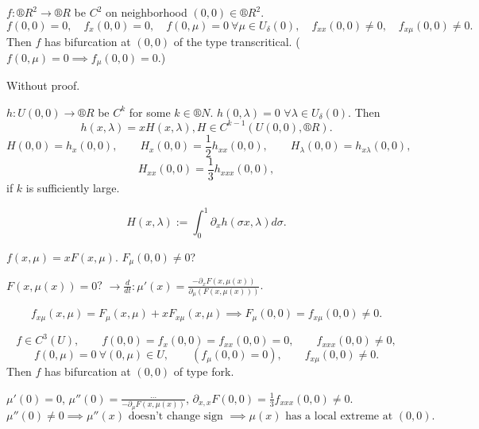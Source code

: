 \documentclass[12pt]{article}					%
\begin{document}
\begin{veta}
	$f: ®R^2 \rightarrow ®R$ be $C^2$ on neighborhood $(0, 0) \in ®R^2$.
	$$ f(0, 0) = 0, \quad f_x(0, 0) = 0, \quad f(0, \mu) = 0\ \forall \mu \in U_\delta(0), \quad f_{xx}(0, 0) ≠ 0, \quad f_{x\mu}(0, 0) ≠ 0. $$
	Then $f$ has bifurcation at $(0, 0)$ of the type transcritical. ($f(0, \mu) = 0 \implies f_\mu(0, 0) = 0$.)

	\begin{dukazin}
		Without proof.
	\end{dukazin}
\end{veta}

\begin{lemma}
	$h: U(0, 0) \rightarrow ®R$ be $C^k$ for some $k \in ®N$. $h(0, \lambda) = 0$ $\forall \lambda \in U_\delta(0)$. Then
	$$ h(x, \lambda) = x H(x, \lambda), H \in C^{k - 1}(U(0, 0), ®R). $$
	$$ H(0, 0) = h_x(0, 0), \qquad H_x(0, 0) = \frac{1}{2} h_{xx}(0, 0), \qquad H_\lambda(0, 0) = h_{x\lambda}(0, 0), $$
	$$ H_{xx}(0, 0) = \frac{1}{3} h_{xxx}(0, 0), $$
	if $k$ is sufficiently large.

	\begin{dukazin}
		$$ H(x, \lambda) := \int_0^1 \partial_x h(\sigma x, \lambda) d\sigma. $$
	\end{dukazin}
\end{lemma}


\begin{dukaz}
	$f(x, \mu) = x F(x, \mu)$. $F_\mu(0, 0) ≠ 0$?

	$F(x, \mu(x)) = 0$? $\rightarrow \frac{d}{dt}: \mu'(x) = \frac{-\partial_x F(x, \mu(x))}{\partial_\mu(F(x, \mu(x)))}$.

	$$ f_{x\mu}(x, \mu) = F_\mu(x, \mu) + x F_{x\mu}(x, \mu) \implies F_\mu(0, 0) = f_{x\mu}(0, 0) ≠ 0. $$
%
\end{dukaz}

\begin{veta}[Fork]
	$$ f \in C^3(U), \qquad f(0, 0) = f_x(0, 0) = f_{xx}(0, 0) = 0, \qquad f_{xxx}(0, 0) ≠ 0, $$
	$$ f(0, \mu) = 0\ \forall (0, \mu) \in U, \qquad (f_\mu(0, 0) = 0), \qquad f_{x\mu}(0, 0) ≠ 0. $$
	Then $f$ has bifurcation at $(0, 0)$ of type fork.

	\begin{dukazin}
		$\mu'(0) = 0$, $\mu''(0) = \frac{…}{-\partial_\mu F(x, \mu(x))}$, $\partial_{x, x} F(0, 0) = \frac{1}{3} f_{xxx}(0, 0) ≠ 0$.
		$$ \mu''(0) ≠ 0 \implies \mu''(x) \text{ doesn't change sign } \implies \mu(x) \text{ has a local extreme at } (0, 0). $$
	\end{dukazin}
\end{veta}
\end{document}
